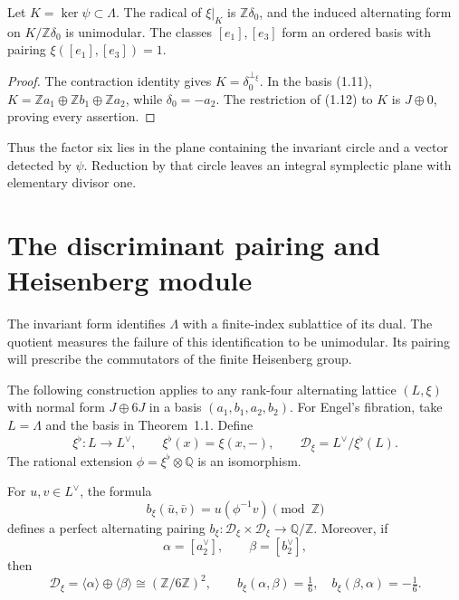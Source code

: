 \documentclass[11pt]{article}
\numberwithin{equation}{section}
\begin{document}
\begin{proposition}\label{prop:reduction}
Let $K=\ker\psi\subset\Lambda$.  The radical of $\xi|_K$ is
$\mathbb Z\delta_0$, and the induced alternating form on
$K/\mathbb Z\delta_0$ is unimodular.  The classes $[e_1],[e_3]$
form an ordered basis with pairing $\xi([e_1],[e_3])=1$.
\end{proposition}

\begin{proof}
The contraction identity gives $K=\delta_0^{\perp_\xi}$.
In the basis (1.11), $K=\mathbb Za_1\oplus\mathbb Zb_1\oplus
\mathbb Za_2$, while $\delta_0=-a_2$.
The restriction of (1.12) to $K$ is $J\oplus0$, proving every assertion.
\end{proof}

Thus the factor six lies in the plane containing the invariant circle
and a vector detected by $\psi$.  Reduction by that circle leaves an
integral symplectic plane with elementary divisor one.

\section{The discriminant pairing and Heisenberg module}

The invariant form identifies $\Lambda$ with a finite-index sublattice
of its dual. The quotient measures the failure of this identification
to be unimodular. Its pairing will prescribe the commutators of the
finite Heisenberg group.

The following construction applies to any rank-four alternating lattice
$(L,\xi)$ with normal form $J\oplus6J$ in a basis
$(a_1,b_1,a_2,b_2)$. For Engel's fibration, take
$L=\Lambda$ and the basis in Theorem~1.1. Define
\[
 \xi^\flat:L\longrightarrow L^\vee,\qquad \xi^\flat(x)=\xi(x,-),
 \qquad
 \mathcal D_\xi=L^\vee/\xi^\flat(L).
\]
The rational extension
$\phi=\xi^\flat\otimes\mathbb Q$ is an isomorphism.

\begin{lemma}
For $u,v\in L^\vee$, the formula
\[
 b_\xi(\bar u,\bar v)=u(\phi^{-1}v)\pmod{\mathbb Z}               \tag{2.1}
\]
defines a perfect alternating pairing
$b_\xi:\mathcal D_\xi\times\mathcal D_\xi\to\mathbb Q/\mathbb Z$.
Moreover, if
\[
 \alpha=[a_2^\vee],\qquad \beta=[b_2^\vee],
\]
then
\[
 \mathcal D_\xi=\langle\alpha\rangle\oplus\langle\beta\rangle
 \cong(\mathbb Z/6\mathbb Z)^2,\qquad
 b_\xi(\alpha,\beta)=\tfrac16,\quad
 b_\xi(\beta,\alpha)=-\tfrac16.                                  \tag{2.2}
\]
\end{lemma}
\end{document}
